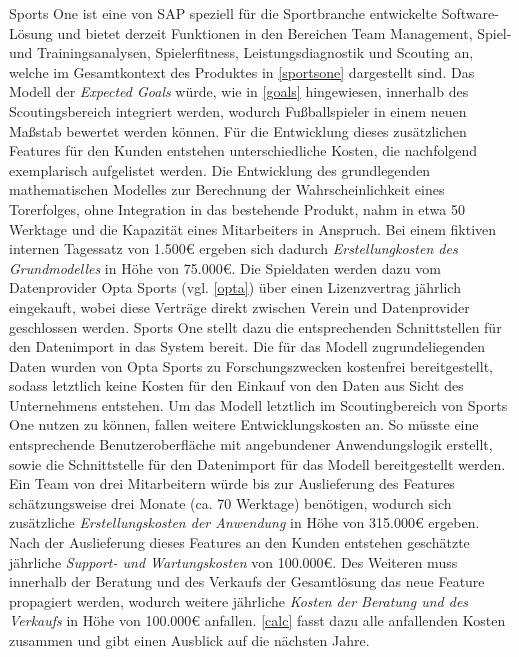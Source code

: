 Sports One ist eine von SAP speziell für die Sportbranche entwickelte Software-Lösung und bietet derzeit Funktionen in den Bereichen Team Management, Spiel- und Trainingsanalysen, Spielerfitness, Leistungsdiagnostik und Scouting an, welche im Gesamtkontext des Produktes in \vref{sportsone} dargestellt sind. Das Modell der \textit{Expected Goals} würde, wie in \vref{goals} hingewiesen, innerhalb des Scoutingsbereich integriert werden, wodurch Fußballspieler in einem neuen Maßstab bewertet werden können. Für die Entwicklung dieses zusätzlichen Features für den Kunden entstehen unterschiedliche Kosten, die nachfolgend exemplarisch aufgelistet werden. Die Entwicklung des grundlegenden mathematischen Modelles zur Berechnung der Wahrscheinlichkeit eines Torerfolges, ohne Integration in das bestehende Produkt, nahm in etwa 50 Werktage und die Kapazität eines Mitarbeiters in Anspruch. Bei einem fiktiven internen Tagessatz von \textsf{1.500\euro} ergeben sich dadurch \textit{Erstellungkosten des Grundmodelles} in Höhe von \textsf{75.000\euro}. Die Spieldaten werden dazu vom Datenprovider Opta Sports (vgl. \vref{opta}) über einen Lizenzvertrag jährlich eingekauft, wobei diese Verträge direkt zwischen Verein und Datenprovider geschlossen werden. Sports One stellt dazu die entsprechenden Schnittstellen für den Datenimport in das System bereit. Die für das Modell zugrundeliegenden Daten wurden von Opta Sports zu Forschungszwecken kostenfrei bereitgestellt, sodass letztlich keine Kosten für den Einkauf von den Daten aus Sicht des Unternehmens entstehen. Um das Modell letztlich im Scoutingbereich von Sports One nutzen zu können, fallen weitere Entwicklungskosten an. So müsste eine entsprechende Benutzeroberfläche mit angebundener Anwendungslogik erstellt, sowie die Schnittstelle für den Datenimport für das Modell bereitgestellt werden. Ein Team von drei Mitarbeitern würde bis zur Auslieferung des Features schätzungsweise drei Monate (ca. 70 Werktage) benötigen, wodurch sich zusätzliche \textit{Erstellungskosten der Anwendung} in Höhe von \textsf{315.000\euro} ergeben. Nach der Auslieferung dieses Features an den Kunden entstehen geschätzte jährliche \textit{Support- und Wartungskosten} von \textsf{100.000\euro}. Des Weiteren muss innerhalb der Beratung und des Verkaufs der Gesamtlösung das neue Feature propagiert werden, wodurch weitere jährliche \textit{Kosten der Beratung und des Verkaufs} in Höhe von \textsf{100.000\euro} anfallen. \vref{calc} fasst dazu alle anfallenden Kosten zusammen und gibt einen Ausblick auf die nächsten Jahre.

